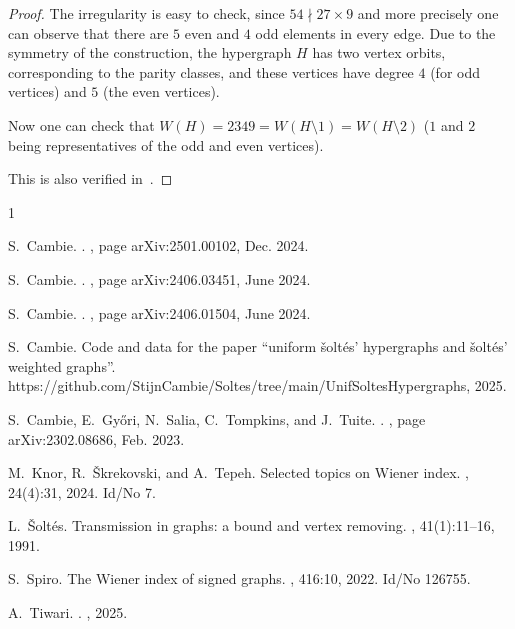\documentclass[a4paper,11pt]{article}
\begin{document}
\begin{proof}

The irregularity is easy to check, since $54 \nmid 27 \times 9$ and more precisely one can observe that there are $5$ even and $4$ odd elements in every edge.
Due to the symmetry of the construction, the hypergraph $H$ has two vertex orbits, corresponding to the parity classes, and these vertices have degree $4$ (for odd vertices) and $5$ (the even vertices).

Now one can check that $W(H)=2349=W(H \setminus 1)=W(H \setminus 2)$ ($1$ and $2$ being representatives of the odd and even vertices).

This is also verified in~\cite[\texttt{UnifSoltesHypergraphs/Verification\_IrregularUSH}]{C25github}.
\end{proof}

% 
% 

\begin{thebibliography}{1}

S.~{Cambie}.
.
, page arXiv:2501.00102, Dec. 2024.

S.~Cambie.
.
, page arXiv:2406.03451, June 2024.

S.~{Cambie}.
.
, page arXiv:2406.01504, June 2024.

S.~Cambie.
\newblock Code and data for the paper ``uniform \v solt\'es' hypergraphs and \v
  solt\'es' weighted graphs''.
\newblock
  https://github.com/StijnCambie/Soltes/tree/main/UnifSoltesHypergraphs, 2025.

S.~{Cambie}, E.~{Gy{\H{o}}ri}, N.~{Salia}, C.~{Tompkins}, and J.~{Tuite}.
.
, page arXiv:2302.08686, Feb. 2023.

M.~Knor, R.~{\v{S}}krekovski, and A.~Tepeh.
\newblock Selected topics on {Wiener} index.
, 24(4):31, 2024.
\newblock Id/No 7.

L.~{\v{S}}olt{\'e}s.
\newblock Transmission in graphs: a bound and vertex removing.
, 41(1):11--16, 1991.

S.~Spiro.
\newblock The {Wiener} index of signed graphs.
, 416:10, 2022.
\newblock Id/No 126755.

A.~Tiwari.
.
, 2025.

\end{thebibliography}
\end{document}
